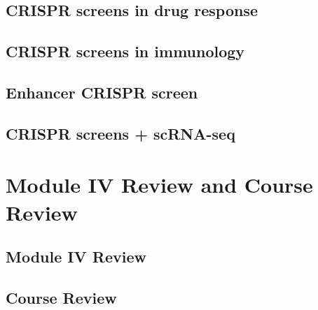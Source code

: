 \documentclass[]{book}
\begin{document}
\hypertarget{crispr-screens-in-drug-response}{%
\section{CRISPR screens in drug response}\label{crispr-screens-in-drug-response}}

\hypertarget{crispr-screens-in-immunology}{%
\section{CRISPR screens in immunology}\label{crispr-screens-in-immunology}}

\hypertarget{enhancer-crispr-screen}{%
\section{Enhancer CRISPR screen}\label{enhancer-crispr-screen}}

\hypertarget{crispr-screens-scrna-seq}{%
\section{CRISPR screens + scRNA-seq}\label{crispr-screens-scrna-seq}}

\hypertarget{m4re}{%
\chapter{Module IV Review and Course Review}\label{m4re}}

\hypertarget{module-iv-review}{%
\section{Module IV Review}\label{module-iv-review}}

\hypertarget{course-review}{%
\section{Course Review}\label{course-review}}
\end{document}
